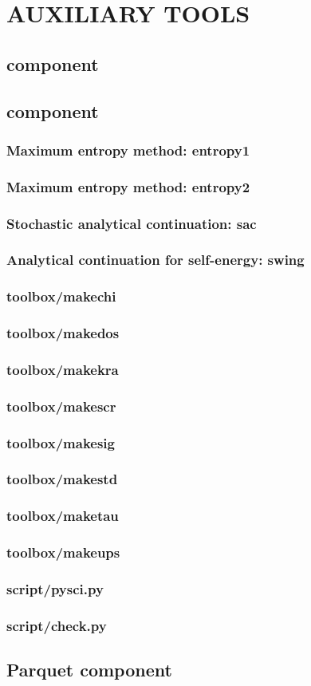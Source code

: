 \chapter{AUXILIARY TOOLS}
\section{{\jasmine} component}
\section{{\hibiscus} component}
\subsection{Maximum entropy method: entropy1}
\subsection{Maximum entropy method: entropy2}
\subsection{Stochastic analytical continuation: sac}
\subsection{Analytical continuation for self-energy: swing}
\subsection{toolbox/makechi}
\subsection{toolbox/makedos}
\subsection{toolbox/makekra}
\subsection{toolbox/makescr}
\subsection{toolbox/makesig}
\subsection{toolbox/makestd}
\subsection{toolbox/maketau}
\subsection{toolbox/makeups}
\subsection{script/pysci.py}
\subsection{script/check.py}
\section{Parquet component}
